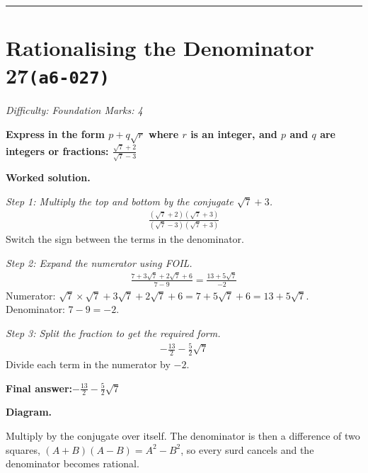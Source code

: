 \documentclass[11pt]{article}
\newcommand{\question}[1]{\par\medskip\noindent\textbf{#1}\par}
\begin{document}
\medskip\hrule

\section*{Rationalising the Denominator 27\quad\small\texttt{(a6-027)}}
\textit{Difficulty: Foundation \quad\textbar\quad Marks: 4}

\question{Express in the form \( p + q\sqrt{r} \) where \( r \) is an integer, and \( p \) and \( q \) are integers or fractions: \( \frac{\sqrt{7} + 2}{\sqrt{7} - 3} \)}

\textbf{Worked solution.}

\textit{Step 1: Multiply the top and bottom by the conjugate \( \sqrt{7} + 3 \).}
\[\begin{gathered}
\frac{(\sqrt{7} + 2)(\sqrt{7} + 3)}{(\sqrt{7} - 3)(\sqrt{7} + 3)}
\end{gathered}\]
Switch the sign between the terms in the denominator.

\textit{Step 2: Expand the numerator using FOIL.}
\[\begin{gathered}
\frac{7 + 3\sqrt{7} + 2\sqrt{7} + 6}{7 - 9} = \frac{13 + 5\sqrt{7}}{-2}
\end{gathered}\]
Numerator: \( \sqrt{7} \times \sqrt{7} + 3\sqrt{7} + 2\sqrt{7} + 6 = 7 + 5\sqrt{7} + 6 = 13 + 5\sqrt{7} \). Denominator: \( 7 - 9 = -2 \).

\textit{Step 3: Split the fraction to get the required form.}
\[\begin{gathered}
-\frac{13}{2} - \frac{5}{2}\sqrt{7}
\end{gathered}\]
Divide each term in the numerator by \( -2 \).

\begin{answerbox}
\textbf{Final answer:}\quad \(\displaystyle -\frac{13}{2} - \frac{5}{2}\sqrt{7}\)
\end{answerbox}
\textbf{Diagram.}

\begin{center}
\end{center}
\small Multiply by the conjugate over itself. The denominator is then a difference of two squares, $(A+B)(A-B)=A^{2}-B^{2}$, so every surd cancels and the denominator becomes rational.\normalsize
\end{document}
